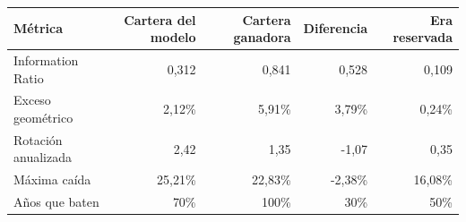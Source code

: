\begin{tabular}{lrrrr}
\toprule
Métrica & Cartera del modelo & Cartera ganadora & Diferencia & Era reservada \\
\midrule
Information Ratio & 0,312 & 0,841 & 0,528 & 0,109 \\
Exceso geométrico & 2,12\% & 5,91\% & 3,79\% & 0,24\% \\
Rotación anualizada & 2,42 & 1,35 & -1,07 & 0,35 \\
Máxima caída & 25,21\% & 22,83\% & -2,38\% & 16,08\% \\
Años que baten & 70\% & 100\% & 30\% & 50\% \\
\bottomrule
\end{tabular}
